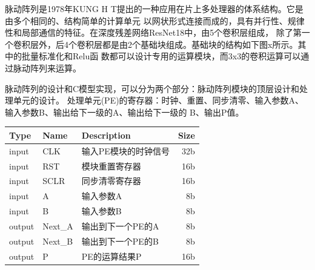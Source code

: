 


脉动阵列是1978年KUNG H T提出的一种应用在片上多处理器的体系结构。它是由多个相同的、结构简单的计算单元
以网状形式连接而成的，具有并行性、规律性和局部通信的特征。在深度残差网络ResNet18中，由5个卷积层组成，
除了第一个卷积层外，后4个卷积层都是由2个基础块组成。基础块的结构如下图x所示。其中的批量标准化和Relu函
数都可以设计专用的运算模块，而3x3的卷积运算可以通过脉动阵列来运算。



脉动阵列的设计和C模型实现，可以分为两个部分：脉动阵列模块的顶层设计和处理单元的设计。
处理单元(PE)的寄存器：时钟、重置、同步清零、输入参数A、输入参数B、输出给下一级的A、输出给下一级的
B、输出P值。

\begin{table}[!hpt]
    \label{tab:firstone}
    \centering
    \begin{tabular}{@{}lllr@{}} \toprule
        Type & Name & Description & Size \\ \midrule
        input  & CLK  & 输入PE模块的时钟信号 & 32b \\
        input  & RST  & 模块重置寄存器 & 16b \\
        input   & SCLR   & 同步清零寄存器 & 16b \\
        input   & A   & 输入参数A & 8b \\
        input   & B   & 输入参数B & 8b \\
        output   & Next\_A   & 输出到下一个PE的A & 8b \\
        output   & Next\_B   & 输出到下一个PE的B & 8b \\
        output & P & PE的运算结果P & 16b \\ \bottomrule
    \end{tabular}
  \end{table}

  

